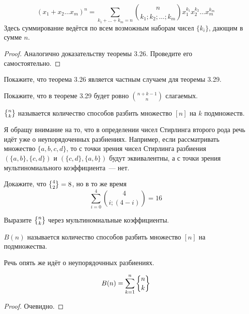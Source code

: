 \begin{thm}
$$(x_1+x_2\ldots x_m)^n = \sum_{k_1+\ldots + k_m = n}{n\choose k_1;k_2;\ldots;k_m}x_1^{k_1}x_2^{k_2}\ldots x_m^{k_m}$$
Здесь суммирование ведётся по всем возможным наборам чисел $\{k_i\}$, дающим в сумме $n$.
\end{thm}
\begin{proof}
Аналогично доказательству теоремы 3.26. Проведите его самостоятельно.
\end{proof}

\begin{exercise}
Покажите, что теорема 3.26 является частным случаем для теоремы 3.29.
\end{exercise}

\begin{exercise}
Покажите, что в теореме 3.29 будет ровно $n + k - 1 \choose n$ слагаемых.
\end{exercise}

\begin{definition}
 $\sstirling{n}{k}$ называется количество способов разбить множество $[n]$ на $k$ подмножеств.
\end{definition}

Я обращу внимание на то, что в определении чисел Стирлинга второго рода речь идёт уже о неупорядоченных разбиениях. Например, если рассматривать множество $\{a, b, c, d\}$, то с точки зрения чисел Стирлинга разбиения $(\{a, b\}, \{c, d\})$ и $(\{c, d\}, \{a, b\})$ будут эквивалентны, а с точки зрения мультиномиального коэффициента~--- нет.

\begin{exercise}
Докажите, что $\sstirling{4}{2} = 8$, но в то же время
$$\sum_{i=0}^4 {4\choose i;(4-i)} = 16$$
\end{exercise}

\begin{exercise}
Выразите $\sstirling{n}{k}$ через мультиномиальные коэффициенты.
\end{exercise}

\begin{definition}
 $B(n)$ называется количество способов разбить множество $[n]$ на подмножества.
\end{definition}

Речь опять же идёт о неупорядочнных разбиениях.

\begin{thm}
$$B(n) = \sum_{k=1}^n\sstirling{n}{k}$$
\end{thm}
\begin{proof}
Очевидно.
\end{proof}

